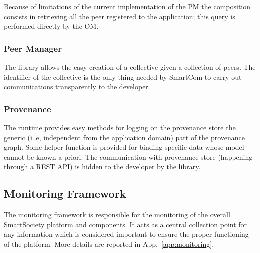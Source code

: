 Because of limitations of the current implementation of the PM the composition consists in retrieving all the peer registered to the application; this query is %
performed directly by the OM.

\subsubsection{Peer Manager}
The library allows the easy creation of a collective given a collection of peers. The identifier of the collective is the only thing needed by SmartCom to carry out communications transparently to the developer.

\subsubsection{Provenance}
The runtime provides easy methods for logging on the provenance store the generic (i..e, independent from the application domain) part of the provenance graph. %
Some helper function is provided for binding specific data whose model cannot be known a priori.
The communication with provenance store (happening through a REST API) is hidden to the developer by the library.

\subsection{Monitoring Framework}
The monitoring framework is responsible for the monitoring of the overall SmartSociety platform and components. It acts as a central collection point for any information which is considered important to ensure the proper functioning of the platform. More details are reported in App.~\ref{app:monitoring}.


